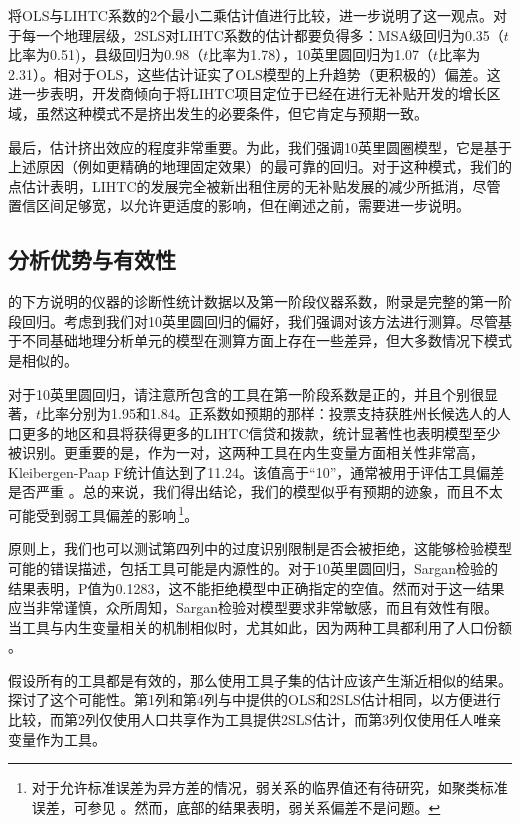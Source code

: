 \documentclass[lang=cn,11pt,a4paper]{paper}
\begin{document}
将OLS与LIHTC系数的2个最小二乘估计值进行比较，进一步说明了这一观点。对于每一个地理层级，2SLS对LIHTC系数的估计都要负得多：MSA级回归为0.35（$t$比率为0.51)，县级回归为0.98（$t$比率为1.78），10英里圆回归为1.07（$t$比率为2.31）。相对于OLS，这些估计证实了OLS模型的上升趋势（更积极的）偏差。这进一步表明，开发商倾向于将LIHTC项目定位于已经在进行无补贴开发的增长区域，虽然这种模式不是挤出发生的必要条件，但它肯定与预期一致。

最后，估计挤出效应的程度非常重要。为此，我们强调10英里圆圈模型，它是基于上述原因（例如更精确的地理固定效果）的最可靠的回归。对于这种模式，我们的点估计表明，LIHTC的发展完全被新出租住房的无补贴发展的减少所抵消，尽管置信区间足够宽，以允许更适度的影响，但在阐述之前，需要进一步说明。

\subsection{分析优势与有效性}

的下方说明的仪器的诊断性统计数据以及第一阶段仪器系数，附录是完整的第一阶段回归。考虑到我们对10英里圆回归的偏好，我们强调对该方法进行测算。尽管基于不同基础地理分析单元的模型在测算方面上存在一些差异，但大多数情况下模式是相似的。

对于10英里圆回归，请注意所包含的工具在第一阶段系数是正的，并且个别很显著，$t$比率分别为1.95和1.84。正系数如预期的那样：投票支持获胜州长候选人的人口更多的地区和县将获得更多的LIHTC信贷和拨款，统计显著性也表明模型至少被识别。更重要的是，作为一对，这两种工具在内生变量方面相关性非常高，Kleibergen-Paap F统计值达到了11.24。该值高于“10”，通常被用于评估工具偏差是否严重 \cite{Stock200580}。总的来说，我们得出结论，我们的模型似乎有预期的迹象，而且不太可能受到弱工具偏差的影响\,\footnote{对于允许标准误差为异方差的情况，弱关系的临界值还有待研究，如聚类标准误差，可参见 \cite{Stock200580}。然而，底部的结果表明，弱关系偏差不是问题。}。

原则上，我们也可以测试第四列中的过度识别限制是否会被拒绝，这能够检验模型可能的错误描述，包括工具可能是内源性的。对于10英里圆回归，Sargan检验的结果表明，P值为0.1283，这不能拒绝模型中正确指定的空值。然而对于这一结果应当非常谨慎，众所周知，Sargan检验对模型要求非常敏感，而且有效性有限。当工具与内生变量相关的机制相似时，尤其如此，因为两种工具都利用了人口份额 \citep{Cameron2006,Murray2006111}。

假设所有的工具都是有效的，那么使用工具子集的估计应该产生渐近相似的结果。探讨了这个可能性。第1列和第4列与中提供的OLS和2SLS估计相同，以方便进行比较，而第2列仅使用人口共享作为工具提供2SLS估计，而第3列仅使用任人唯亲变量作为工具。
\end{document}
